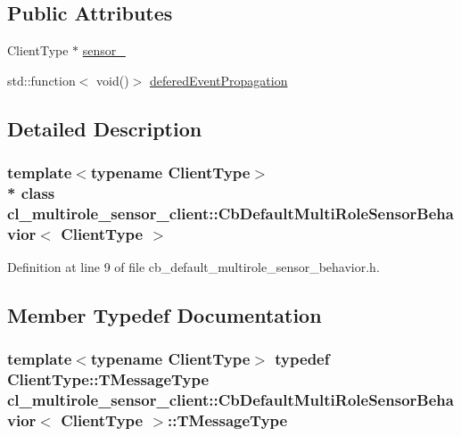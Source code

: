 \subsection*{Public Attributes}
\begin{DoxyCompactItemize}
\item 
Client\+Type $\ast$ \hyperlink{classcl__multirole__sensor__client_1_1CbDefaultMultiRoleSensorBehavior_aada7313c036af6f60b1bd64e4a57b23f}{sensor\+\_\+}
\item 
std\+::function$<$ void()$>$ \hyperlink{classcl__multirole__sensor__client_1_1CbDefaultMultiRoleSensorBehavior_a62e83702dd5eaa660fc13d7ebdb4850e}{defered\+Event\+Propagation}
\end{DoxyCompactItemize}


\subsection{Detailed Description}
\subsubsection*{template$<$typename Client\+Type$>$\\*
class cl\+\_\+multirole\+\_\+sensor\+\_\+client\+::\+Cb\+Default\+Multi\+Role\+Sensor\+Behavior$<$ Client\+Type $>$}



Definition at line 9 of file cb\+\_\+default\+\_\+multirole\+\_\+sensor\+\_\+behavior.\+h.



\subsection{Member Typedef Documentation}
\subsubsection[{\texorpdfstring{T\+Message\+Type}{TMessageType}}]{\setlength{\rightskip}{0pt plus 5cm}template$<$typename Client\+Type$>$ typedef Client\+Type\+::\+T\+Message\+Type {\bf cl\+\_\+multirole\+\_\+sensor\+\_\+client\+::\+Cb\+Default\+Multi\+Role\+Sensor\+Behavior}$<$ Client\+Type $>$\+::{\bf T\+Message\+Type}}\hypertarget{classcl__multirole__sensor__client_1_1CbDefaultMultiRoleSensorBehavior_a4217b1d33467f30625d7735e5612efc0}{}\label{classcl__multirole__sensor__client_1_1CbDefaultMultiRoleSensorBehavior_a4217b1d33467f30625d7735e5612efc0}


